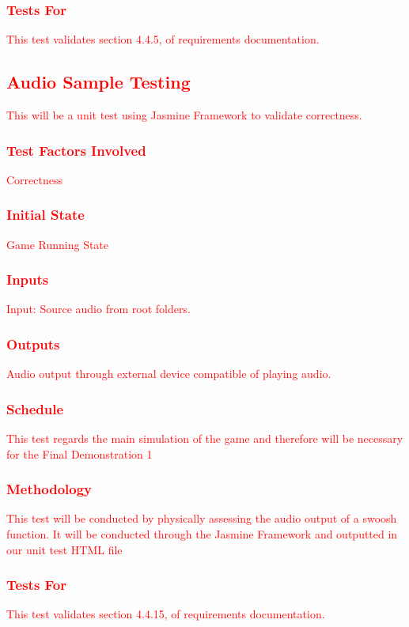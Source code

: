 \documentclass[11pt, oneside]{article}   	%
\begin{document}
\subsubsection{\textcolor{red}{Tests For}}
\textcolor{red}{This test validates section 4.4.5, of requirements documentation.}


\subsection{\textcolor{red}{Audio Sample Testing}}
\textcolor{red}{This will be a unit test using Jasmine Framework to validate correctness.}
\subsubsection{\textcolor{red}{Test Factors Involved}}
\textcolor{red}{Correctness}
\subsubsection{\textcolor{red}{Initial State}}
\textcolor{red}{Game Running State}
\subsubsection{\textcolor{red}{Inputs}}
\textcolor{red}{Input: Source audio from root folders.}
\subsubsection{\textcolor{red}{Outputs}}
\textcolor{red}{Audio output through external device compatible of playing audio.}
\subsubsection{\textcolor{red}{Schedule}}
\textcolor{red}{This test regards the main simulation of the game and therefore will be necessary for the Final Demonstration 1}
\subsubsection{\textcolor{red}{Methodology}}
\textcolor{red}{This test will be conducted by physically assessing the audio output of a swoosh function. It will be conducted through the Jasmine Framework and outputted in our unit test HTML file}
\subsubsection{\textcolor{red}{Tests For}}
\textcolor{red}{This test validates section 4.4.15, of requirements documentation.}
\end{document}
